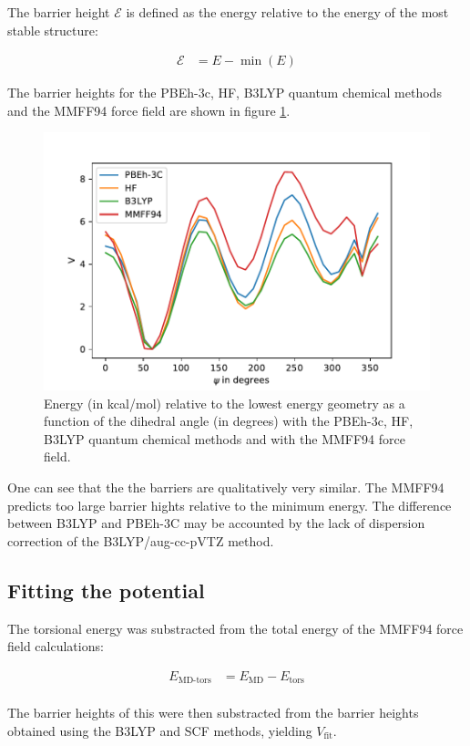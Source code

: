 \documentclass[10pt]{article}
\begin{document}
The barrier height $\mathcal{E}$ is defined as the energy relative to the energy of the most stable structure:

\begin{align}
\mathcal{E} &= E - \min (E)
\end{align}

The barrier heights for the PBEh-3c, HF, B3LYP quantum chemical methods and the MMFF94 force field are shown in figure \ref{fig:scan}.

\begin{figure}[ht!]
\centering
\includegraphics[width=0.7\linewidth]{fig/scan}
\caption{Energy (in kcal/mol) relative to the lowest energy geometry as a function of the dihedral angle (in degrees) with the PBEh-3c, HF, B3LYP quantum chemical methods and with the MMFF94 force field.}
\label{fig:scan}
\end{figure}

One can see that the the barriers are qualitatively very similar. The MMFF94 predicts too large barrier hights relative to the minimum energy. The difference between B3LYP and PBEh-3C may be accounted by the lack of dispersion correction of the B3LYP/aug-cc-pVTZ method.

\subsection{Fitting the potential}

The torsional energy was substracted from the total energy of the MMFF94 force field calculations:

\begin{align}
E_{\text{MD-tors}} &= E_{\text{MD}} - E_{\text{tors}}\\
\end{align}

The barrier heights of this were then substracted from the barrier heights obtained using the B3LYP and SCF methods, yielding $V_{\text{fit}}$. 
\end{document}
